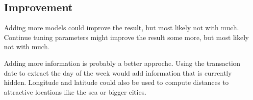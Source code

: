 \documentclass[a4paper]{article}
\begin{document}

\subsection{Improvement}
Adding more models could improve the result, but most likely not with much. Continue tuning parameters might
improve the result some more, but most likely not with much.

Adding more information is probably a better approche. Using the transaction date to extract the day of the
week would add information that is currently hidden. Longitude and latitude could also be used to compute
distances to attractive locations like the sea or bigger cities.
\end{document}
